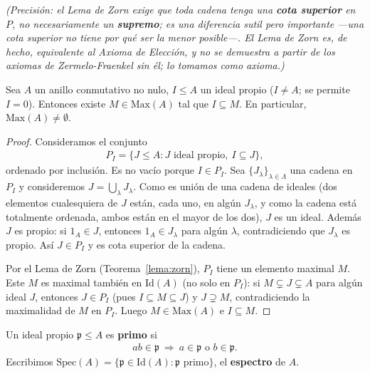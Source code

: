 \emph{(Precisión: el Lema de Zorn exige que toda cadena tenga una \textbf{cota superior} en $P$, no necesariamente un \textbf{supremo}; es una diferencia sutil pero importante —una cota superior no tiene por qué ser la menor posible—. El Lema de Zorn es, de hecho, equivalente al Axioma de Elección, y no se demuestra a partir de los axiomas de Zermelo-Fraenkel sin él; lo tomamos como axioma.)}

\begin{teo}\label{teo:krull}
Sea $A$ un anillo conmutativo no nulo, $I\leq A$ un ideal propio ($I\neq A$; se permite $I=0$). Entonces existe $M\in \mathrm{Max}(A)$ tal que $I \subseteq M$. En particular, $\mathrm{Max}(A)\neq\emptyset$.
\end{teo}
\begin{proof}
Consideramos el conjunto
\begin{gather*}
    P_I = \{J \leq A : J \text{ ideal propio},\ I \subseteq J\},
\end{gather*}
ordenado por inclusión. Es no vacío porque $I\in P_I$. Sea $\{J_\lambda\}_{\lambda\in \Lambda}$ una cadena en $P_I$ y consideremos $J=\bigcup_{\lambda} J_\lambda$. Como es unión de una cadena de ideales (dos elementos cualesquiera de $J$ están, cada uno, en algún $J_\lambda$, y como la cadena está totalmente ordenada, ambos están en el mayor de los dos), $J$ es un ideal. Además $J$ es propio: si $1_A\in J$, entonces $1_A \in J_\lambda$ para algún $\lambda$, contradiciendo que $J_\lambda$ es propio. Así $J\in P_I$ y es cota superior de la cadena.

Por el Lema de Zorn (Teorema~\ref{lema:zorn}), $P_I$ tiene un elemento maximal $M$. Este $M$ es maximal también en $\mathrm{Id}(A)$ (no solo en $P_I$): si $M \subsetneq J \subsetneq A$ para algún ideal $J$, entonces $J\in P_I$ (pues $I\subseteq M\subseteq J$) y $J\supsetneq M$, contradiciendo la maximalidad de $M$ en $P_I$. Luego $M\in \mathrm{Max}(A)$ e $I\subseteq M$.
\end{proof}

\begin{definicion}
Un ideal propio $\mathfrak p \leq A$ es \textbf{primo} si
\begin{gather*}
    ab\in \mathfrak p \ \Rightarrow \ a\in \mathfrak p \text{ o } b\in \mathfrak p.
\end{gather*}
Escribimos $\mathrm{Spec}(A) = \{\mathfrak p \in \mathrm{Id}(A) : \mathfrak p \text{ primo}\}$, el \textbf{espectro} de $A$.
\end{definicion}

